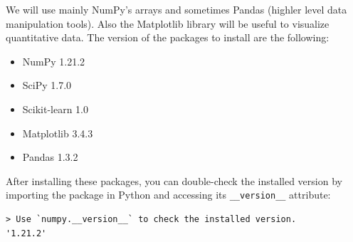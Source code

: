 \documentclass[12pt]{report}
\theoremstyle{largebreak}
\begin{document}
    We will use mainly NumPy's arrays and sometimes Pandas (highler level data manipulation tools). Also the Matplotlib library will be useful to visualize quantitative data. The version of the packages to install are the following:
    \begin{itemize}
        \item NumPy 1.21.2
        \item SciPy 1.7.0
        \item Scikit-learn 1.0
        \item Matplotlib 3.4.3
        \item Pandas 1.3.2
    \end{itemize}
    After installing these packages, you can double-check the installed version by importing the package in Python and accessing its \lstinline|__version__| attribute:
    \begin{lstlisting}[caption={Check Version of Packages},label=code:version_package_verification]
> Use `numpy.__version__` to check the installed version.
'1.21.2'
    \end{lstlisting}
\end{document}
